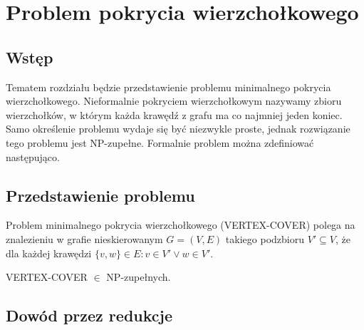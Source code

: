\chapter{Problem pokrycia wierzchołkowego}

\section{Wstęp}
	
Tematem rozdziału będzie przedstawienie problemu minimalnego pokrycia wierzchołkowego. Nieformalnie pokryciem wierzchołkowym nazywamy zbioru wierzchołków, w którym każda krawędź z grafu ma co najmniej jeden koniec. Samo określenie problemu wydaje się być niezwykle proste, jednak rozwiązanie tego problemu jest NP-zupełne. Formalnie problem można zdefiniować następująco.

\section{Przedstawienie problemu}

Problem minimalnego pokrycia wierzchołkowego (VERTEX-COVER) polega na znalezieniu w grafie nieskierowanym $G=(V,E)$ takiego podzbioru  $V' \subseteq V$, że dla każdej krawędzi $\{v,w\} \in E: v \in V' \lor w \in V'$.

\begin{twr}
VERTEX-COVER $\in$ NP-zupełnych.
\end{twr}

\section{Dowód przez redukcje}

